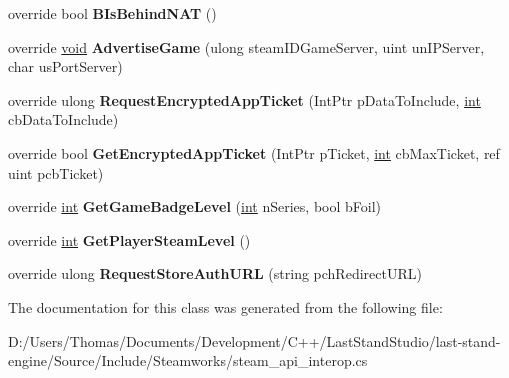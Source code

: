 \begin{DoxyCompactItemize}
\item 
\hypertarget{classValve_1_1Steamworks_1_1CSteamUser_ad96fbcf987252459e5d520239fedb51c}{}override bool {\bfseries B\+Is\+Behind\+N\+A\+T} ()\label{classValve_1_1Steamworks_1_1CSteamUser_ad96fbcf987252459e5d520239fedb51c}

\item 
\hypertarget{classValve_1_1Steamworks_1_1CSteamUser_a45765098145f8be39e449aee794d4f86}{}override \hyperlink{SDL__audio_8h_a52835ae37c4bb905b903cbaf5d04b05f}{void} {\bfseries Advertise\+Game} (ulong steam\+I\+D\+Game\+Server, uint un\+I\+P\+Server, char us\+Port\+Server)\label{classValve_1_1Steamworks_1_1CSteamUser_a45765098145f8be39e449aee794d4f86}

\item 
\hypertarget{classValve_1_1Steamworks_1_1CSteamUser_af1641c9be19e0c15d12d84d71ce20ef2}{}override ulong {\bfseries Request\+Encrypted\+App\+Ticket} (Int\+Ptr p\+Data\+To\+Include, \hyperlink{SDL__thread_8h_a6a64f9be4433e4de6e2f2f548cf3c08e}{int} cb\+Data\+To\+Include)\label{classValve_1_1Steamworks_1_1CSteamUser_af1641c9be19e0c15d12d84d71ce20ef2}

\item 
\hypertarget{classValve_1_1Steamworks_1_1CSteamUser_aa0b3b591add13dab591f02a98ca526d4}{}override bool {\bfseries Get\+Encrypted\+App\+Ticket} (Int\+Ptr p\+Ticket, \hyperlink{SDL__thread_8h_a6a64f9be4433e4de6e2f2f548cf3c08e}{int} cb\+Max\+Ticket, ref uint pcb\+Ticket)\label{classValve_1_1Steamworks_1_1CSteamUser_aa0b3b591add13dab591f02a98ca526d4}

\item 
\hypertarget{classValve_1_1Steamworks_1_1CSteamUser_af52d1bf61b5a87ac40dd7bbd1c5bcc58}{}override \hyperlink{SDL__thread_8h_a6a64f9be4433e4de6e2f2f548cf3c08e}{int} {\bfseries Get\+Game\+Badge\+Level} (\hyperlink{SDL__thread_8h_a6a64f9be4433e4de6e2f2f548cf3c08e}{int} n\+Series, bool b\+Foil)\label{classValve_1_1Steamworks_1_1CSteamUser_af52d1bf61b5a87ac40dd7bbd1c5bcc58}

\item 
\hypertarget{classValve_1_1Steamworks_1_1CSteamUser_a54b14e144c97f9da511b82c3c3517f90}{}override \hyperlink{SDL__thread_8h_a6a64f9be4433e4de6e2f2f548cf3c08e}{int} {\bfseries Get\+Player\+Steam\+Level} ()\label{classValve_1_1Steamworks_1_1CSteamUser_a54b14e144c97f9da511b82c3c3517f90}

\item 
\hypertarget{classValve_1_1Steamworks_1_1CSteamUser_a9a728ef0d5e5da864218f7e6d47d6bad}{}override ulong {\bfseries Request\+Store\+Auth\+U\+R\+L} (string pch\+Redirect\+U\+R\+L)\label{classValve_1_1Steamworks_1_1CSteamUser_a9a728ef0d5e5da864218f7e6d47d6bad}

\end{DoxyCompactItemize}


The documentation for this class was generated from the following file\+:\begin{DoxyCompactItemize}
\item 
D\+:/\+Users/\+Thomas/\+Documents/\+Development/\+C++/\+Last\+Stand\+Studio/last-\/stand-\/engine/\+Source/\+Include/\+Steamworks/steam\+\_\+api\+\_\+interop.\+cs\end{DoxyCompactItemize}
